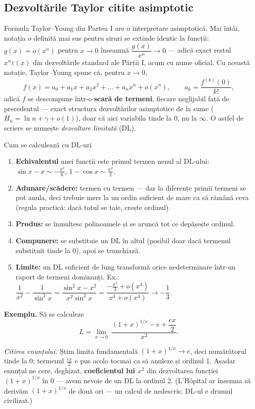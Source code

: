 \subsection{Dezvoltările Taylor citite asimptotic}

Formula Taylor--Young din Partea I are o interpretare asimptotică. Mai întâi, notația $o$ definită mai sus pentru șiruri se extinde identic la funcții: $g(x)=o(x^n)$ pentru $x\to0$ înseamnă $\dfrac{g(x)}{x^n}\to0$ --- adică exact restul $x^n\varepsilon(x)$ din dezvoltările standard ale Părții I, acum cu nume oficial. Cu această notație, Taylor--Young spune că, pentru $x\to0$,
\[
f(x)=a_0+a_1x+a_2x^2+\dots+a_nx^n+o(x^n),
\qquad a_k=\frac{f^{(k)}(0)}{k!},
\]
adică $f$ se descompune într-o \textbf{scară de termeni}, fiecare neglijabil față de precedentul --- exact structura dezvoltărilor asimptotice de la sume ($H_n=\ln n+\gamma+o(1)$), doar că aici variabila tinde la $0$, nu la $\infty$. O astfel de scriere se numește \emph{dezvoltare limitată} (DL).

\begin{tehbox}{Cum se calculează cu DL-uri}
\begin{enumerate}[leftmargin=*, itemsep=1pt]
\item \textbf{Echivalentul} unei funcții este primul termen nenul al DL-ului: $\sin x-x\sim-\frac{x^3}{6}$, $1-\cos x\sim\frac{x^2}{2}$.
\item \textbf{Adunare/scădere:} termen cu termen --- dar la diferențe primii termeni se pot anula, deci trebuie mers la un ordin suficient de mare ca să rămână ceva (regula practică: dacă totul se taie, crește ordinul).
\item \textbf{Produs:} se înmulțesc polinoamele și se aruncă tot ce depășește ordinul.
\item \textbf{Compunere:} se substituie un DL în altul (posibil doar dacă termenul substituit tinde la $0$), apoi se trunchiază.
\item \textbf{Limite:} un DL suficient de lung transformă orice nedeterminare într-un raport de termeni dominanți. Ex.: $\dfrac{1}{x^2}-\dfrac{1}{\sin^2x}=\dfrac{\sin^2x-x^2}{x^2\sin^2x}=\dfrac{-\frac{x^4}{3}+o(x^4)}{x^4+o(x^4)}\to-\dfrac13$.
\end{enumerate}
\end{tehbox}

\medskip
\textbf{Exemplu.} Să se calculeze
\[
L=\lim_{x\to0}\ \frac{(1+x)^{1/x}-e+\dfrac{ex}{2}}{x^{2}}.
\]

\emph{Citirea enunțului.} Știm limita fundamentală $(1+x)^{1/x}\to e$, deci numărătorul tinde la $0$; termenul $\frac{ex}2$ e pus acolo tocmai ca să anuleze și ordinul 1. Așadar enunțul ne cere, deghizat, \textbf{coeficientul lui $x^2$} din dezvoltarea funcției $(1+x)^{1/x}$ în $0$ --- avem nevoie de un DL la ordinul 2. (L'Hôpital ar însemna să derivăm $(1+x)^{1/x}$ de două ori --- un calcul de nedescris; DL-ul e drumul civilizat.)

